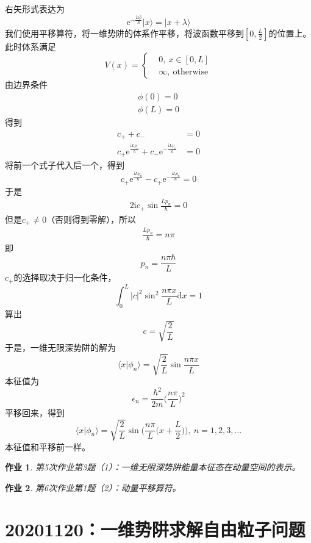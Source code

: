 \documentclass[12pt]{article}
\newtheorem{asg}{作业}
\begin{document}
    右矢形式表达为
    \[ \mathrm{e}^{-\frac {\mathrm{i}\lambda \hat{p}}{\hbar}} | x\rangle = |x+\lambda \rangle \]
    我们使用平移算符，将一维势阱的体系作平移，将波函数平移到$[0,\frac L2]$的位置上。此时体系满足
    \begin{equation*}
        V(x) = \left \{
            \begin{aligned}
                &0,\ x\in [0, L]\\
                &\infty, \ \mathrm{otherwise}
            \end{aligned}
            \right.
    \end{equation*}
    由边界条件
    \begin{align*}
        \phi(0)= 0\\
        \phi(L) = 0
    \end{align*}
    得到
    \begin{align*}
        c_+ +c_- &= 0\\
        c_+\mathrm{e}^{\frac {\mathrm{i}Lp_n}{\hbar}}+c_-\mathrm{e}^{-\frac {\mathrm{i}Lp_n}{\hbar}} &= 0
    \end{align*}
    将前一个式子代入后一个，得到
    \[ c_+\mathrm{e}^{\frac {\mathrm{i}Lp_n}{\hbar}}-c_+ \mathrm{e}^{-\frac {\mathrm{i}Lp_n}{\hbar}} = 0 \]
    于是
    \begin{align*}
        2\mathrm{i}c_+ \sin{\frac {Lp_n}{\hbar}} = 0
    \end{align*}
    但是$c_+ \neq 0$（否则得到零解），所以
    \begin{align*}
        \frac {Lp_n}{\hbar} = n\pi
    \end{align*}
    即
    \[ p_n = \frac {n\pi \hbar}{L} \]
    $c_+$的选择取决于归一化条件，
    \[ \int_0^L |c|^2 \sin^2{\frac {n\pi x}L}\mathrm{d}x = 1 \]
    算出
    \[ c = \sqrt{\frac 2L} \]
    于是，一维无限深势阱的解为
    \[ \langle x|\phi_n \rangle = \sqrt{\frac 2L} \sin{\frac {n\pi x}L} \]
    本征值为
    \[ \epsilon_n = \frac {\hbar^2}{2m} \bigg(\frac {n\pi}L\bigg)^2 \]
    平移回来，得到
    \[ \langle x|\phi_n \rangle = \sqrt{\frac 2L} \sin{\bigg(\frac {n\pi}L\bigg(x+\frac L2\bigg)\bigg)}, \ n=1,2,3,... \]
    本征值和平移前一样。
    \begin{asg}
        第5次作业第3题（1）：一维无限深势阱能量本征态在动量空间的表示。
    \end{asg}
    \begin{asg}
        第6次作业第1题（2）：动量平移算符。
    \end{asg}

\section{20201120：一维势阱求解自由粒子问题}
\end{document}
